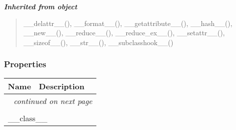 \large{\textbf{\textit{Inherited from object}}}

\begin{quote}
\_\_delattr\_\_(), \_\_format\_\_(), \_\_getattribute\_\_(), \_\_hash\_\_(), \_\_new\_\_(), \_\_reduce\_\_(), \_\_reduce\_ex\_\_(), \_\_setattr\_\_(), \_\_sizeof\_\_(), \_\_str\_\_(), \_\_subclasshook\_\_()
\end{quote}


  \subsubsection{Properties}

    \vspace{-1cm}
\hspace{\varindent}\begin{longtable}{|p{\varnamewidth}|p{\vardescrwidth}|l}
\cline{1-2}
\cline{1-2} \centering \textbf{Name} & \centering \textbf{Description}& \\
\cline{1-2}
\endhead\cline{1-2}\multicolumn{3}{r}{\small\textit{continued on next page}}\\\endfoot\cline{1-2}
\endlastfoot\multicolumn{2}{|l|}{\textit{Inherited from object}}\\
\multicolumn{2}{|p{\varwidth}|}{\raggedright \_\_class\_\_}\\
\cline{1-2}
\end{longtable}

